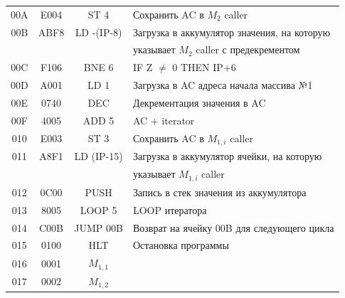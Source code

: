 \begin{center}
\begin{tabular}{|c|c|c|l|}
        00A                   & E004                  & ST 4               & Сохранить AC в $M_{2}$ caller                       \\
        00B                   & ABF8                  & LD -(IP-8)         & Загрузка в аккумулятор значения, на которую       \\
        &                       &                    & указывает $M_2$ caller с предекрементом           \\
        00C                   & F106                  & BNE 6              & IF Z $\neq$ 0 THEN IP+6                               \\
        00D                   & A001                  & LD 1               & Загрузка в AC адреса начала массива №1            \\
        00E                   & 0740                  & DEC                & Декрементация значения в AC                       \\
        00F                   & 4005                  & ADD 5              & AC + iterator                                     \\
        010                   & E003                  & ST 3               & Сохранить AC в $M_{1,i}$ caller                     \\
        011                   & A8F1                  & LD (IP-15)         & Загрузка в аккумулятор ячейки, на которую         \\
        &                       &                    & указывает $M_{1,i}$ caller                        \\
        012                   & 0C00                  & PUSH               & Запись в стек значения из аккумулятора            \\
        013                   & 8005                  & LOOP 5             & LOOP итератора                                    \\
        014                   & C00B                  & JUMP 00B           & Возврат на ячейку 00B для следующего цикла        \\
        015                   & 0100                  & HLT                & Остановка программы                               \\
        \hline
        016                   & 0001                  & $M_{1,1}$          &                                                   \\
        017                   & 0002                  & $M_{1,2}$          &                                                   \\

\end{tabular}
\end{center}
